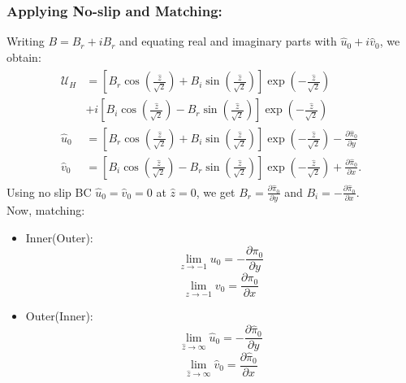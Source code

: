 \documentclass{article}
\newcommand{\pd}[2]{\frac{\partial{#1}}{\partial{#2}}}
\begin{document}
\subsubsection{Applying No-slip and Matching:}
Writing $B = B_{r} + i B_{r}$ and equating real and imaginary parts with $\hat{u}_{0} + i \hat{v}_{0}$, we obtain:
\begin{align}
 \begin{split}
  \mathcal{U}_{H} &= \left[B_{r}\cos{\left(\frac{\hat{z}}{\sqrt{2}} \right)} + B_{i}\sin{\left(\frac{\hat{z}}{\sqrt{2}} \right)}\right] \exp{\left(-\frac{\hat{z}}{\sqrt{2}} \right)} \\
  &+ i \left[B_{i}\cos{\left(\frac{\hat{z}}{\sqrt{2}} \right)} - B_{r}\sin{\left(\frac{\hat{z}}{\sqrt{2}} \right)} \right] \exp{\left(-\frac{\hat{z}}{\sqrt{2}} \right)}\\
  \hat{u}_{0} &= \left[B_{r}\cos{\left(\frac{\hat{z}}{\sqrt{2}} \right)} + B_{i}\sin{\left(\frac{\hat{z}}{\sqrt{2}} \right)}\right] \exp{\left(-\frac{\hat{z}}{\sqrt{2}} \right)} - \pd{\hat{\pi}_{0}}{y}\\
  \hat{v}_{0} &= \left[B_{i}\cos{\left(\frac{\hat{z}}{\sqrt{2}} \right)} - B_{r}\sin{\left(\frac{\hat{z}}{\sqrt{2}} \right)} \right] \exp{\left(-\frac{\hat{z}}{\sqrt{2}} \right)} + \pd{\hat{\pi}_{0}}{x}.
 \end{split}
\end{align}
Using no slip BC $\hat{u}_{0} = \hat{v}_{0} = 0$ at $\hat{z} = 0$, we get $B_{r} = \pd{\hat{\pi}_{0}}{y}$ and $B_{i} = -\pd{\hat{\pi}_{0}}{x}$.\\
%
Now, matching:
\begin{itemize}
 \item Inner(Outer): 
 \begin{equation}
  \lim_{z\rightarrow -1} u_{0} = -\pd{\pi_{0}}{y}
 \end{equation}
 \begin{equation}
  \lim_{z\rightarrow -1} v_{0} = \pd{\pi_{0}}{x}
 \end{equation}
 \item Outer(Inner):
  \begin{equation}
  \lim_{\hat{z}\rightarrow \infty} \hat{u}_{0} = -\pd{\hat{\pi}_{0}}{y}
 \end{equation}
 \begin{equation}
  \lim_{\hat{z}\rightarrow \infty} \hat{v}_{0} = \pd{\hat{\pi}_{0}}{x}
 \end{equation}
\end{itemize}
\end{document}

